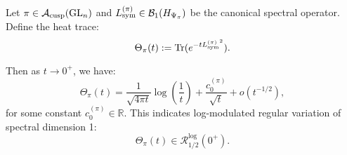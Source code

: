 \begin{proposition}
\label{prop:spectral_heat_trace_expansion_pi}
Let \( \pi \in \mathcal{A}_{\mathrm{cusp}}(\mathrm{GL}_n) \) and \( {L_{\mathrm{sym}}^{(\pi)}} \in \mathcal{B}_1(H_{\Psi_{\pi}}) \) be the canonical spectral operator. Define the heat trace:
\[
\Theta_\pi(t) := \operatorname{Tr}(e^{-t {L_{\mathrm{sym}}^{(\pi)}}^2}).
\]

Then as \( t \to 0^+ \), we have:
\[
\Theta_\pi(t) = \frac{1}{\sqrt{4\pi t}} \log\left( \frac{1}{t} \right)
+ \frac{c_0^{(\pi)}}{\sqrt{t}} + o(t^{-1/2}),
\]
for some constant \( c_0^{(\pi)} \in \mathbb{R} \). This indicates log-modulated regular variation of spectral dimension 1:
\[
\Theta_\pi(t) \in \mathcal{R}_{1/2}^{\log}(0^+).
\]
\end{proposition}
